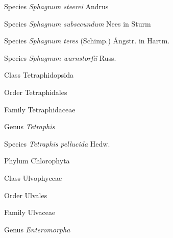 \documentclass[9pt, article]{memoir}
\begin{document}
\begin{multicols}{2}
\vspace{6pt}\noindent\hspace{36pt}Species \textit{Sphagnum steerei} Andrus


\vspace{6pt}\noindent\hspace{36pt}Species \textit{Sphagnum subsecundum} Nees in Sturm


\vspace{6pt}\noindent\hspace{36pt}Species \textit{Sphagnum teres} (Schimp.) Ångstr. in Hartm.


\vspace{6pt}\noindent\hspace{36pt}Species \textit{Sphagnum warnstorfii} Russ.


\vspace{6pt}\noindent\hspace{12pt}Class Tetraphidopsida


\vspace{6pt}\noindent\hspace{18pt}Order Tetraphidales


\vspace{6pt}\noindent\hspace{24pt}Family Tetraphidaceae


\vspace{6pt}\noindent\hspace{30pt}Genus \textit{Tetraphis}


\vspace{6pt}\noindent\hspace{36pt}Species \textit{Tetraphis pellucida} Hedw.


\vspace{6pt}\noindent\hspace{6pt}Phylum Chlorophyta


\vspace{6pt}\noindent\hspace{12pt}Class Ulvophyceae


\vspace{6pt}\noindent\hspace{18pt}Order Ulvales


\vspace{6pt}\noindent\hspace{24pt}Family Ulvaceae


\vspace{6pt}\noindent\hspace{30pt}Genus \textit{Enteromorpha}



\end{multicols}
\end{document}
